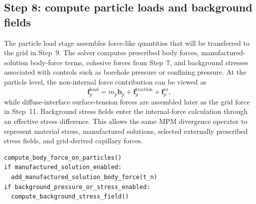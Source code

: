 \subsection{Step 8: compute particle loads and background fields}
\label{subsec:solver-step-8}
The particle load stage assembles force-like quantities that will be transferred to the grid in Step~9.  The solver computes prescribed body forces, manufactured-solution body-force terms, cohesive forces from Step~7, and background stresses associated with controls such as borehole pressure or confining pressure.  At the particle level, the non-internal force contribution can be viewed as
\begin{equation}
  \mathbf{f}_{p}^{\mathrm{load}} = m_p\mathbf{b}_p
  + \mathbf{f}_{p}^{\mathrm{traction}}
  + \mathbf{f}_{p}^{\mathrm{cz}},
\end{equation}
while diffuse-interface surface-tension forces are assembled later as the grid force  in Step~11.  Background stress fields enter the internal-force calculation through an effective stress difference.  This allows the same MPM divergence operator to represent material stress, manufactured solutions, selected externally prescribed stress fields, and grid-derived capillary forces.

\begin{lstlisting}[caption={Particle load calculation.},basicstyle=\ttfamily\small]
compute_body_force_on_particles()
if manufactured_solution_enabled:
  add_manufactured_solution_body_force(t_n)
if background_pressure_or_stress_enabled:
  compute_background_stress_field()
\end{lstlisting}

